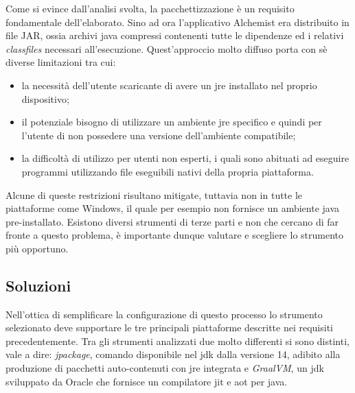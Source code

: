 Come si evince dall'analisi svolta, la pacchettizzazione è un requisito fondamentale dell'elaborato. Sino ad ora l'applicativo Alchemist era distribuito in file JAR, ossia archivi java compressi contenenti tutte le dipendenze ed i relativi \textit{classfiles} necessari all'esecuzione. Quest'approccio molto diffuso porta con sè diverse limitazioni tra cui:
\begin{itemize}
	\item la necessità dell'utente scaricante di avere un \ac{jre} installato nel proprio dispositivo;
	\item il potenziale bisogno di utilizzare un ambiente \ac{jre} specifico e quindi per l'utente di non possedere una versione dell'ambiente compatibile;
	\item la difficoltà di utilizzo per utenti non esperti, i quali sono abituati ad eseguire programmi utilizzando file eseguibili nativi della propria piattaforma.
\end{itemize}
Alcune di queste restrizioni risultano mitigate, tuttavia non in tutte le piattaforme come Windows, il quale per esempio non fornisce un ambiente java pre-installato. Esistono diversi strumenti di terze parti e non che cercano di far fronte a questo problema, è importante dunque valutare e scegliere lo strumento più opportuno.

\subsection{Soluzioni}

Nell'ottica di semplificare la configurazione di questo processo lo strumento selezionato deve supportare le tre principali piattaforme descritte nei requisiti precedentemente. Tra gli strumenti analizzati due molto differenti si sono distinti, vale a dire: \textit{jpackage}, comando disponibile nel \ac{jdk} dalla versione 14, adibito alla produzione di pacchetti auto-contenuti con \ac{jre} integrata e \textit{GraalVM}, un \ac{jdk} sviluppato da Oracle che fornisce un compilatore \ac{jit} e \ac{aot} per java. 

